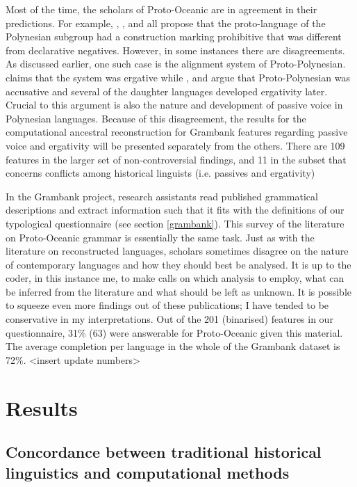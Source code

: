 \documentclass[draft,10pt]{article} %
\begin{document}
Most of the time, the scholars of Proto-Oceanic are in agreement in their predictions. For example, \citet[142]{pawley1973some}, \citet[292]{ross2007two}, \citet[xiii, 125]{clark1976aspects} and \citet[89]{lynchrosscrowley_proto_grammar_oceanic} all propose that the proto-language of the Polynesian subgroup had a construction marking prohibitive that was different from declarative negatives. However, in some instances there are disagreements. As discussed earlier, one such case is the alignment system of Proto-Polynesian. \citet{clark1976aspects} claims that the system was ergative while \citet{hale_1968}, \citet{hohepa_1967,hohepa_1969} and \citet{chung1978} argue that Proto-Polynesian was accusative and several of the daughter languages developed ergativity later. Crucial to this argument is also the nature and development of passive voice in Polynesian languages. Because of this disagreement, the results for the computational ancestral reconstruction for Grambank features regarding passive voice and ergativity will be presented separately from the others. There are 109 features in the larger set of non-controversial findings, and 11 in the subset that concerns conflicts among historical linguists (i.e. passives and ergativity)

In the Grambank project, research assistants read published grammatical descriptions and extract information such that it fits with the definitions of our typological questionnaire (see section \ref{grambank}). This survey of the literature on Proto-Oceanic grammar is essentially the same task. Just as with the literature on reconstructed languages, scholars sometimes disagree on the nature of contemporary languages and how they should best be analysed. It is up to the coder, in this instance me, to make calls on which analysis to employ, what can be inferred from the literature and what should be left as unknown. It is possible to squeeze even more findings out of these publications; I have tended to be conservative in my interpretations. Out of the 201 (binarised) features in our questionnaire, 31\% (63) were answerable for Proto-Oceanic given this material. The average completion per language in the whole of the Grambank dataset is 72\%. <insert update numbers>

\newpage
\section{Results}

\subsection{Concordance between traditional historical linguistics and computational methods}
\end{document}
